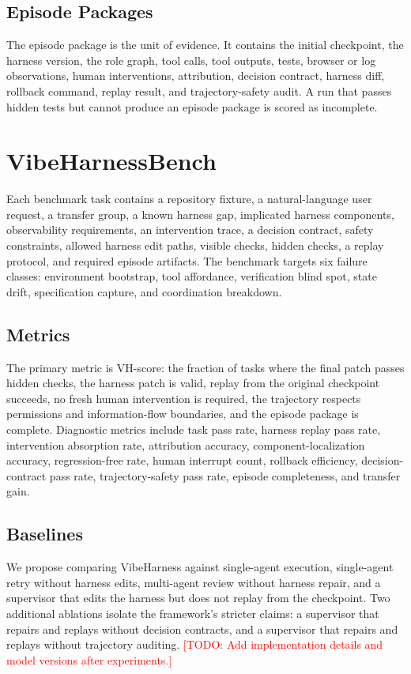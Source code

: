 \documentclass[11pt]{article}
\newcommand{\todo}[1]{\textcolor{red}{[TODO: #1]}}
\begin{document}
\subsection{Episode Packages}

The episode package is the unit of evidence. It contains the initial checkpoint,
the harness version, the role graph, tool calls, tool outputs, tests, browser or
log observations, human interventions, attribution, decision contract, harness
diff, rollback command, replay result, and trajectory-safety audit. A run that
passes hidden tests but cannot produce an episode package is scored as
incomplete.

\section{VibeHarnessBench}

Each benchmark task contains a repository fixture, a natural-language user
request, a transfer group, a known harness gap, implicated harness components,
observability requirements, an intervention trace, a decision contract, safety
constraints, allowed harness edit paths, visible checks, hidden checks, a replay
protocol, and required episode artifacts. The benchmark targets six failure
classes: environment bootstrap, tool affordance, verification blind spot, state
drift, specification capture, and coordination breakdown.

\subsection{Metrics}

The primary metric is VH-score: the fraction of tasks where the final patch
passes hidden checks, the harness patch is valid, replay from the original
checkpoint succeeds, no fresh human intervention is required, the trajectory
respects permissions and information-flow boundaries, and the episode package is
complete. Diagnostic metrics include task pass rate, harness replay pass rate,
intervention absorption rate, attribution accuracy, component-localization
accuracy, regression-free rate, human interrupt count, rollback efficiency,
decision-contract pass rate, trajectory-safety pass rate, episode completeness,
and transfer gain.

\subsection{Baselines}

We propose comparing VibeHarness against single-agent execution, single-agent
retry without harness edits, multi-agent review without harness repair, and a
supervisor that edits the harness but does not replay from the checkpoint. Two
additional ablations isolate the framework's stricter claims: a supervisor that
repairs and replays without decision contracts, and a supervisor that repairs and
replays without trajectory auditing.
\todo{Add implementation details and model versions after experiments.}
\end{document}
